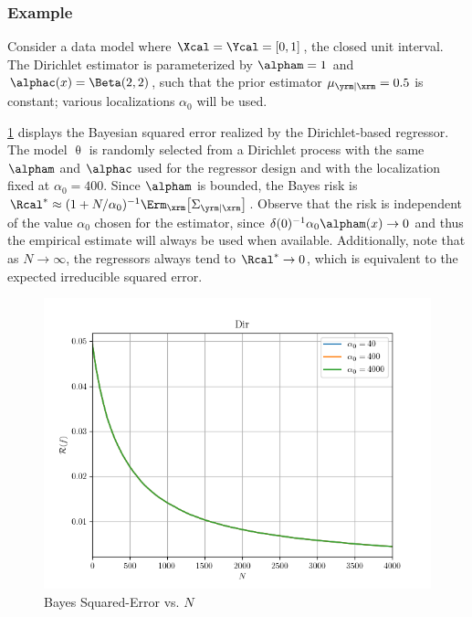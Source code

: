 \documentclass[12pt]{report}
\begin{document}
\subsubsection{Example} \label{sec:SE_dir_cont_example}

Consider a data model where $\Xcal = \Ycal = [0, 1]$, the closed unit interval. The Dirichlet estimator is parameterized by $\alpham = 1$ and $\alphac(x) = \Beta(2, 2)$, such that the prior estimator $\mu_{\yrm | \xrm} = 0.5$ is constant; various localizations $\alpha_0$ will be used. 

\cref{fig:Continuous/SE/risk_bayes_N_leg_a0} displays the Bayesian squared error realized by the Dirichlet-based regressor. The model $\uptheta$ is randomly selected from a Dirichlet process with the same $\alpham$ and $\alphac$ used for the regressor design and with the localization fixed at $\alpha_0 = 400$. Since $\alpham$ is bounded, the Bayes risk is $\Rcal^* \approx (1 + N / \alpha_0)^{-1} \Erm_{\xrm}\big[ \Sigma_{\yrm | \xrm} \big]$. Observe that the risk is independent of the value $\alpha_0$ chosen for the estimator, since $\delta(0)^{-1} \alpha_0 \alpham(x) \to 0$ and thus the empirical estimate will always be used when available. Additionally, note that as $N \to \infty$, the regressors always tend to $\Rcal^* \to 0$, which is equivalent to the expected irreducible squared error.
\begin{figure}
	\centering
	\includegraphics[width=0.8\linewidth]{Continuous/SE/risk_bayes_N_leg_a0.png}
	\caption{Bayes Squared-Error vs. $N$}
	\label{fig:Continuous/SE/risk_bayes_N_leg_a0}
\end{figure}
\end{document}
